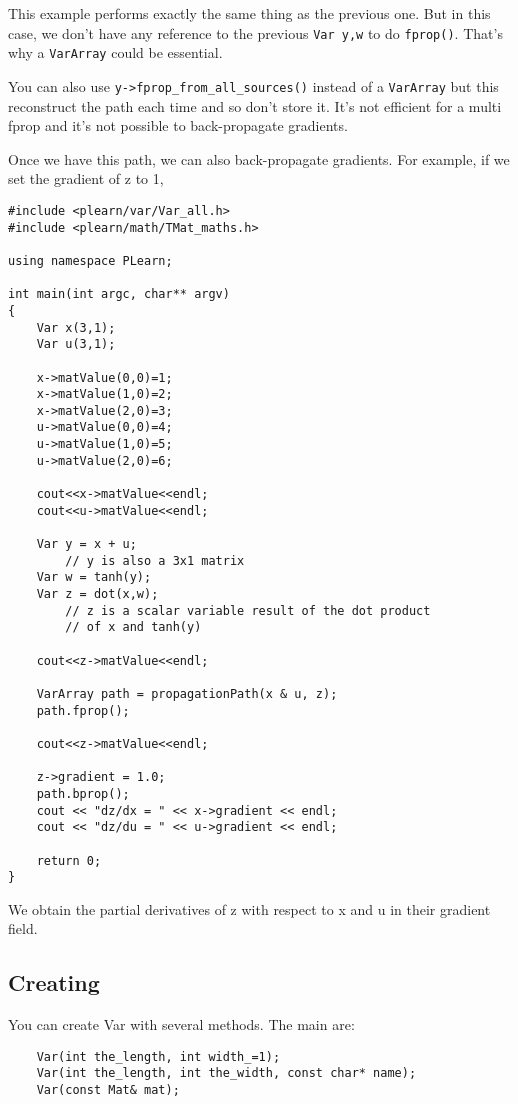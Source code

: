 \documentclass[11pt]{book}
\begin{document}
This example performs exactly the same thing as the previous one. But
in this case, we don't have any reference to the previous \texttt{Var
y,w} to do \texttt{fprop()}. That's why a \texttt{VarArray} could be
essential.

You can also use \texttt{y->fprop\_from\_all\_sources()} instead of a
\texttt{VarArray} but this reconstruct the path each time and so don't
store it. It's not efficient for a multi fprop and it's not possible to
back-propagate gradients.

Once we have this path, we can also back-propagate gradients. For
example, if we set the gradient of z to 1,

\begin{verbatim}
#include <plearn/var/Var_all.h>
#include <plearn/math/TMat_maths.h>

using namespace PLearn;

int main(int argc, char** argv)
{
    Var x(3,1);
    Var u(3,1);

    x->matValue(0,0)=1;
    x->matValue(1,0)=2;
    x->matValue(2,0)=3;
    u->matValue(0,0)=4;
    u->matValue(1,0)=5;
    u->matValue(2,0)=6;

    cout<<x->matValue<<endl;
    cout<<u->matValue<<endl;

    Var y = x + u;
        // y is also a 3x1 matrix
    Var w = tanh(y);
    Var z = dot(x,w);
        // z is a scalar variable result of the dot product
        // of x and tanh(y)

    cout<<z->matValue<<endl;

    VarArray path = propagationPath(x & u, z);
    path.fprop();

    cout<<z->matValue<<endl;

    z->gradient = 1.0;
    path.bprop();
    cout << "dz/dx = " << x->gradient << endl;
    cout << "dz/du = " << u->gradient << endl;

    return 0;
}
\end{verbatim}

 We obtain the partial derivatives of z with respect to x and u in their
 gradient field.


\subsection{Creating}

You can create Var with several methods.
The main are:
\begin{verbatim}
    Var(int the_length, int width_=1);
    Var(int the_length, int the_width, const char* name);
    Var(const Mat& mat);
\end{verbatim}
\end{document}
